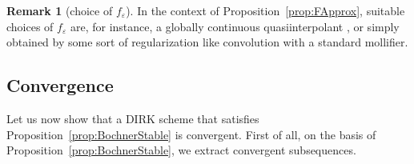 \documentclass{amsart}
\newcommand{\nrm}[1]{\left\| #1 \right\|}
\newcommand{\Real}{\mathbb{R}}
\newcommand{\mclK}{\mathcal{K}}
\newcommand{\mclQ}{\mathcal{Q}}
\newtheorem{lemma}{Lemma}[section]
\theoremstyle{definition}
\newtheorem{remark}{Remark}[section]
\begin{document}
\begin{remark}[choice of $f_\varepsilon$]
  In the context of Proposition~\ref{prop:FApprox}, suitable choices of $f_\varepsilon$ are, for instance, a globally continuous quasiinterpolant \cite{MR3702417}, or simply obtained by some sort of regularization like convolution with a standard mollifier.
\end{remark}

\subsection{Convergence}

Let us now show that a DIRK scheme that satisfies Proposition~\ref{prop:BochnerStable} is convergent. First of all, on the basis of Proposition~\ref{prop:BochnerStable}, we extract convergent subsequences.

%
\end{document}
